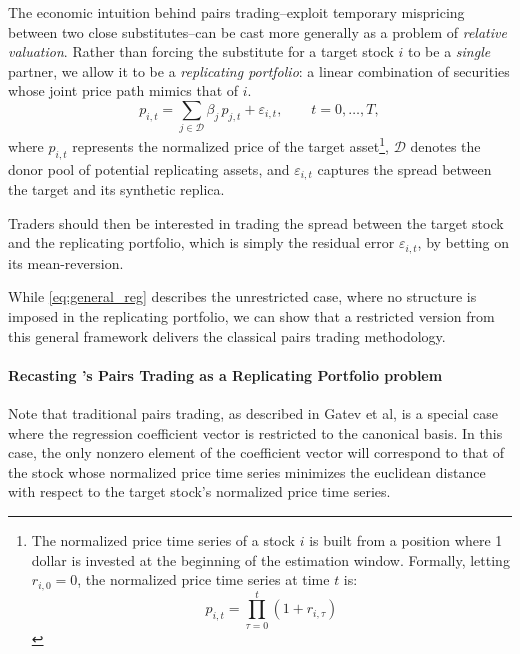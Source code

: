 The economic intuition behind pairs trading--exploit temporary mispricing between two close substitutes--can be cast more generally as a problem of \emph{relative valuation}.  Rather than forcing the substitute for a target stock $i$ to be a \emph{single} partner, we allow it to be a \emph{replicating portfolio}: a linear combination of securities whose joint price path mimics that of $i$.
\begin{equation} \label{eq:regression}
p_{i,t}= \sum_{j\in\mathcal D} \beta_j\,p_{j,t}+ \varepsilon_{i,t},
\qquad t=0,\dots,T ,
\end{equation}
where $p_{i,t}$ represents the normalized price of the target asset\footnote{
The normalized price time series of a stock $i$ is built from a position where 1 dollar is invested at the beginning of the estimation window. Formally, letting $r_{i,0}=0$, the normalized price time series at time $t$ is:
$$
p_{i,t} = \prod_{\tau=0}^t (1+r_{i,\tau} )
$$
}, $\mathcal{D}$ denotes the donor pool of potential replicating assets, and $\varepsilon_{i,t}$ captures the spread between the target and its synthetic replica. 

Traders should then be interested in trading the spread between the target stock and the replicating portfolio, which is simply the residual error $\varepsilon_{i,t}$, by betting on its mean-reversion. 

While \cref{eq:general_reg} describes the unrestricted case, where no structure is imposed in the replicating portfolio, we can show that a restricted version from this general framework delivers the classical pairs trading methodology. 


 
\paragraph{Recasting \cite{Gatev2006}'s Pairs Trading as a Replicating Portfolio problem}
Note that traditional pairs trading, as described in Gatev et al, is a special case where the regression coefficient vector is restricted to the canonical basis. In this case, the only nonzero element of the coefficient vector will correspond to that of the stock whose normalized price time series minimizes the euclidean distance with respect to the target stock's normalized price time series.

